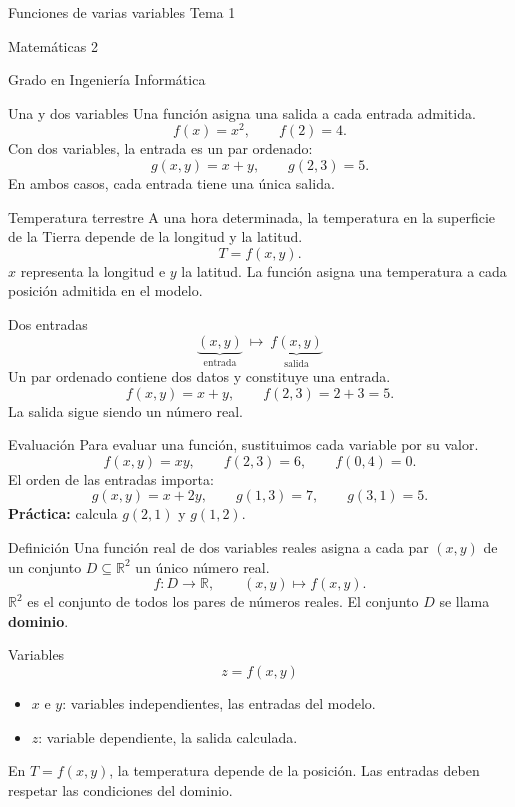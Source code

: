 

\begin{frame}{Funciones de varias variables}
\centering\LARGE Tema 1\par\bigskip
\large Matemáticas 2\par Grado en Ingeniería Informática
\end{frame}
\begin{frame}{Una y dos variables}
Una función asigna una salida a cada entrada admitida.
\[f(x)=x^2,\qquad f(2)=4.\]
Con dos variables, la entrada es un par ordenado:
\[g(x,y)=x+y,\qquad g(2,3)=5.\]
En ambos casos, cada entrada tiene una única salida.
\end{frame}
\begin{frame}{Temperatura terrestre}
A una hora determinada, la temperatura en la superficie de la Tierra depende de la longitud y la latitud.
\[T=f(x,y).\]
$x$ representa la longitud e $y$ la latitud.
\medskip
La función asigna una temperatura a cada posición admitida en el modelo.
\end{frame}
\begin{frame}{Dos entradas}
\[\underbrace{(x,y)}_{\text{entrada}}\ \longmapsto\ \underbrace{f(x,y)}_{\text{salida}}\]
Un par ordenado contiene dos datos y constituye una entrada.
\[f(x,y)=x+y,\qquad f(2,3)=2+3=5.\]
La salida sigue siendo un número real.
\end{frame}
\begin{frame}{Evaluación}
Para evaluar una función, sustituimos cada variable por su valor.
\[f(x,y)=xy,\qquad f(2,3)=6,\qquad f(0,4)=0.\]
El orden de las entradas importa:
\[g(x,y)=x+2y,\qquad g(1,3)=7,\qquad g(3,1)=5.\]
\textbf{Práctica:} calcula $g(2,1)$ y $g(1,2)$.
\end{frame}
\begin{frame}{Definición}
Una función real de dos variables reales asigna a cada par $(x,y)$ de un conjunto $D\subseteq\mathbb R^2$ un único número real.
\[f:D\longrightarrow\mathbb R,\qquad (x,y)\longmapsto f(x,y).\]
$\mathbb R^2$ es el conjunto de todos los pares de números reales.
\medskip
El conjunto $D$ se llama \textbf{dominio}.
\end{frame}
\begin{frame}{Variables}
\[z=f(x,y)\]
\begin{itemize}
\item $x$ e $y$: variables independientes, las entradas del modelo.
\item $z$: variable dependiente, la salida calculada.
\end{itemize}
En $T=f(x,y)$, la temperatura depende de la posición.
\medskip
Las entradas deben respetar las condiciones del dominio.
\end{frame}
